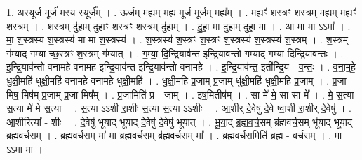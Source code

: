 \documentclass[17pt]{extarticle}
\begin{document}
1. अ॒स्यूर्ज॒ मूर्ज॑ मस्य॒ स्यूर्ज᳚म् । . ऊर्ज॒म् मह्य॒म् मह्य॒ मूर्ज॒ मूर्ज॒म् मह्य᳚म् । . मह्यꣳ॑ श॒स्त्रꣳ श॒स्त्रम् मह्य॒म् मह्यꣳ॑ श॒स्त्रम् । . श॒स्त्रम् दु॑हाम् दुहाꣳ श॒स्त्रꣳ श॒स्त्रम् दु॑हाम् । . दु॒हा॒ मा दु॑हाम् दुहा॒ मा । . आ मा॒ मा ऽऽमा᳚ । . मा॒ श॒स्त्रस्य॑ श॒स्त्रस्य॑ मा मा श॒स्त्रस्य॑ । . श॒स्त्रस्य॑ श॒स्त्रꣳ श॒स्त्रꣳ श॒स्त्रस्य॑ श॒स्त्रस्य॑ श॒स्त्रम् । . श॒स्त्रम् ग॑म्याद् गम्या च्छ॒स्त्रꣳ श॒स्त्रम् ग॑म्यात् । . ग॒म्या॒ दि॒न्द्रि॒याव॑न्त इन्द्रि॒याव॑न्तो गम्याद् गम्या दिन्द्रि॒याव॑न्तः । . इ॒न्द्रि॒याव॑न्तो वनामहे वनामह इन्द्रि॒याव॑न्त इन्द्रि॒याव॑न्तो वनामहे । . इ॒न्द्रि॒याव॑न्त॒ इती᳚न्द्रि॒य - व॒न्तः॒ । . व॒ना॒म॒हे॒ धु॒क्षी॒महि॑ धुक्षी॒महि॑ वनामहे वनामहे धुक्षी॒महि॑ । . धु॒क्षी॒महि॑ प्र॒जाम् प्र॒जाम् धु॑क्षी॒महि॑ धुक्षी॒महि॑ प्र॒जाम् । . प्र॒जा मिष॒ मिष॑म् प्र॒जाम् प्र॒जा मिष᳚म् । . प्र॒जामिति॑ प्र - जाम् । . इष॒मितीष᳚म् । . सा मे॑ मे॒ सा सा मे᳚ । . मे॒ स॒त्या स॒त्या मे॑ मे स॒त्या । . स॒त्या ऽऽशी रा॒शीः स॒त्या स॒त्या ऽऽशीः । . आ॒शीर् दे॒वेषु॑ दे॒वे ष्वा॒शी रा॒शीर् दे॒वेषु॑ । . आ॒शीरित्या᳚ - शीः । . दे॒वेषु॑ भूयाद् भूयाद् दे॒वेषु॑ दे॒वेषु॑ भूयात् । . भू॒या॒द् ब्र॒ह्म॒व॒र्च॒सम् ब्र॑ह्मवर्च॒सम् भू॑याद् भूयाद् ब्रह्मवर्च॒सम् । . ब्र॒ह्म॒व॒र्च॒सम् मा॑ मा ब्रह्मवर्च॒सम् ब्र॑ह्मवर्च॒सम् मा᳚ । . ब्र॒ह्म॒व॒र्च॒समिति॑ ब्रह्म - व॒र्च॒सम् । . मा ऽऽमा॒ मा । \newline
\end{document}
